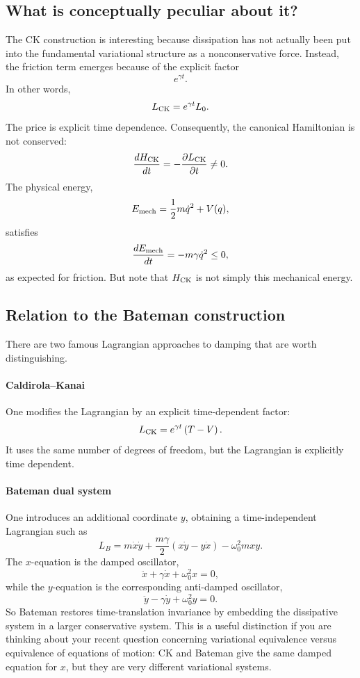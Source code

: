 \subsection{ What is conceptually peculiar about it?}
The CK construction is interesting because dissipation has not actually been put into the fundamental variational structure as a nonconservative force.
Instead, the friction term emerges because of the explicit factor
$$ e^{\gamma t}. $$
In other words,
$$ L_{\rm CK}=e^{\gamma t}L_0. $$
The price is explicit time dependence. Consequently, the canonical Hamiltonian is not conserved:
$$ \frac{dH_{\rm CK}}{dt} = -\frac{\partial L_{\rm CK}}{\partial t} \neq0. $$
The physical energy,
$$ E_{\rm mech} = \frac12m\dot q^2+V(q), $$
satisfies
$$ \frac{dE_{\rm mech}}{dt} = -m\gamma\dot q^2\leq0, $$
as expected for friction.
But note that \(H_{\rm CK}\) is not simply this mechanical energy.

\subsection{Relation to the Bateman construction}
There are two famous Lagrangian approaches to damping that are worth distinguishing.
\paragraph{Caldirola–Kanai}
One modifies the Lagrangian by an explicit time-dependent factor:
$$ L_{\rm CK} = e^{\gamma t} \left(T-V\right). $$
It uses the same number of degrees of freedom, but the Lagrangian is explicitly time dependent.

\paragraph{Bateman dual system}
One introduces an additional coordinate \(y\), obtaining a time-independent Lagrangian such as
$$ L_B = m\dot x\dot y +\frac{m\gamma}{2}(x\dot y-y\dot x) -\omega_0^2mxy. $$
The \(x\)-equation is the damped oscillator,
$$ \ddot x+\gamma\dot x+\omega_0^2x=0, $$
while the \(y\)-equation is the corresponding anti-damped oscillator,
$$ \ddot y-\gamma\dot y+\omega_0^2y=0. $$
So Bateman restores time-translation invariance by embedding the dissipative system in a larger conservative system.
This is a useful distinction if you are thinking about your recent question concerning variational equivalence versus equivalence of equations of motion: CK and Bateman give the same damped equation for \(x\), but they are very different variational systems.

